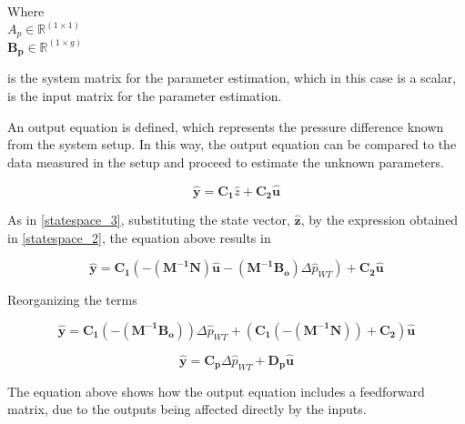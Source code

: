 \begin{minipage}[t]{0.20\textwidth}
Where\\
\hspace*{8mm} $A_p \in \mathbb{R}^{(1 \times 1)} $ \\
\newline
\hspace*{8mm} $\pmb{B_p} \in \pmb{\mathbb{R}}^{(1 \times g)} $ 
\end{minipage}
\begin{minipage}[t]{0.68\textwidth}
\vspace*{2mm}
is the system matrix for the parameter estimation, which in this case is a scalar, \\
is the input matrix for the parameter estimation.
\end{minipage} 

An output equation is defined, which represents the pressure difference known from the system setup. In this way, the output equation can be compared 
to the data measured in the setup and proceed to estimate the unknown parameters. 

\begin{equation}
\pmb{\hat{y}} = \pmb{C_{1}} \hat{z}  + \pmb{C_{2}}\pmb{\hat{u}}  
 \label{statespace_5}
\end{equation}

As in \eqref{statespace_3}, substituting the state vector, $\pmb{\hat{z}}$, by the expression obtained in \eqref{statespace_2}, the equation above results in 

\begin{equation}
\pmb{\hat{y}} = \pmb{C_{1}} (-(\pmb{M^{-1}}\pmb{N})\pmb{\hat{u}} - (\pmb{M^{-1}}\pmb{B_o})\Delta \hat{p}_{WT})  + \pmb{C_{2}}\pmb{\hat{u}}  
 \label{statespace_6}
\end{equation}

Reorganizing the terms

\begin{equation}
\pmb{\hat{y}} = \pmb{C_{1}} (-(\pmb{M^{-1}}\pmb{B_o})) \Delta \hat{p}_{WT} + (\pmb{C_{1}} (-(\pmb{M^{-1}}\pmb{N})) + \pmb{C_{2}}) \pmb{\hat{u}}  
 \label{finaloutput}
\end{equation}

\begin{equation}
  \pmb{\hat{y}} = \pmb{C_p} \Delta \hat{p}_{WT} + \pmb{D_p} \pmb{\hat{u}} 
  \label{outputfinaleq}
\end{equation}

The equation above shows how the output equation includes a feedforward matrix, due to the outputs being affected directly by the inputs.


